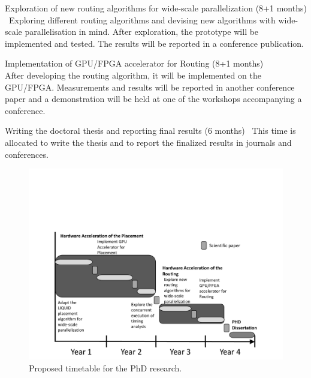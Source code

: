 \documentclass[a4paper,oneside,12pt]{article}
\begin{document}
\begin{description*}
\begin{description*}
\item[Exploration of new routing algorithms for wide-scale parallelization (8+1 months)]\
Exploring different routing algorithms and devising new algorithms with wide-scale parallelisation in mind. After exploration, the prototype will be implemented and tested. The results will be reported in a conference publication.
\item[Implementation of GPU/FPGA accelerator for Routing (8+1 months)]\
\\After developing the routing algorithm, it will be implemented on the GPU/FPGA. Measurements and results will be reported in another conference paper and a demonstration will be held at one of the workshops accompanying a conference.
\end{description*}

\item[Writing the doctoral thesis and reporting final results (6 months)]\
This time is allocated to write the thesis and to report the finalized results in journals and conferences.

\end{description*}

\begin{figure}[ht]
\centering
\includegraphics[width = \textwidth,trim = 0mm 0mm 0mm 65mm, clip]{timeschedule.pdf}
\caption{Proposed timetable for the PhD research.}
\label{timeschedule}
\end{figure}




\newpage

\end{document}
